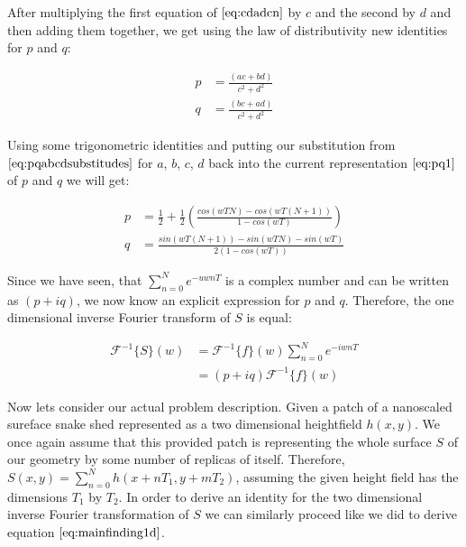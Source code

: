After multiplying the first equation of $\ref{eq:cdadcn}$ by $c$ and the second by $d$ and then adding them together, we get using the law of distributivity new identities for $p$ and $q$:

\begin{align}
p& =\frac{(ac+bd)}{c^2 + d^2} \nonumber \\
q& =\frac{(bc+ad)}{c^2 + d^2}
\label{eq:pq1}
\end{align}

Using some trigonometric identities and putting our substitution from $\ref{eq:pqabcdsubstitudes}$ for $a$, $b$, $c$, $d$ back into the current representation $\ref{eq:pq1}$ of $p$ and $q$ we will get:

\begin{align}
p& =\frac{1}{2}+\frac{1}{2}\left(\frac{cos(wTN)-cos(wT(N+1))}{1-cos(wT)}\right) \nonumber \\
q& =\frac{sin(wT(N+1))-sin(wTN)-sin(wT)}{2(1-cos(wT))}
\end{align}

Since we have seen, that $\sum_{n=0}^N e^{-uwnT}$ is a complex number and can be written as $(p+iq)$, we now know an explicit expression for $p$ and $q$. Therefore, the one dimensional inverse Fourier transform of $S$ is equal:

\begin{align}
\mathcal{F}^{-1}\{S\}(w)
& =\mathcal{F}^{-1}\{f\}(w) \sum_{n=0}^{N} e^{-iwnT} \nonumber \\
& = (p+iq) \mathcal{F}^{-1}\{f\}(w)  
\label{eq:mainfinding1d}
\end{align}


Now lets consider our actual problem description. Given a patch of a nanoscaled sureface snake shed represented as a two dimensional heightfield $h(x,y)$. We once again assume that this provided patch is representing the whole surface $S$ of our geometry by some number of replicas of itself. Therefore, $S(x,y) = \sum_{n=0}^{N} h(x+nT_1, y+mT_2)$, assuming the given height field has the dimensions $T_1$ by $T_2$. In order to derive an identity for the two dimensional inverse Fourier transformation of $S$ we can similarly proceed like we did to derive equation $\ref{eq:mainfinding1d}$.

